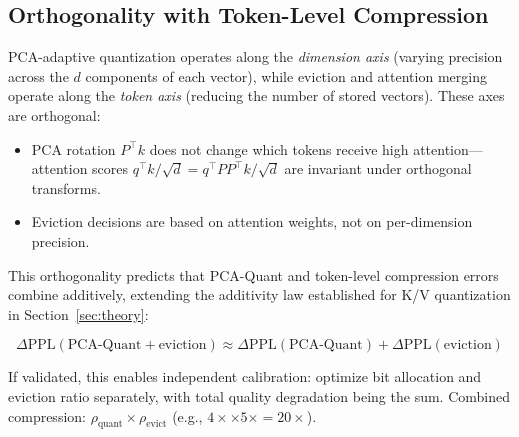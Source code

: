 \subsection{Orthogonality with Token-Level Compression}
\label{sec:orthogonality}

PCA-adaptive quantization operates along the \emph{dimension axis} (varying precision across the $d$ components of each vector), while eviction and attention merging operate along the \emph{token axis} (reducing the number of stored vectors). These axes are orthogonal:

\begin{itemize}
    \item PCA rotation $P^\top k$ does not change which tokens receive high attention---attention scores $q^\top k / \sqrt{d} = q^\top P P^\top k / \sqrt{d}$ are invariant under orthogonal transforms.
    \item Eviction decisions are based on attention weights, not on per-dimension precision.
\end{itemize}

This orthogonality predicts that PCA-Quant and token-level compression errors combine additively, extending the additivity law established for K/V quantization in Section~\ref{sec:theory}:

\begin{equation}
    \Delta\text{PPL}(\text{PCA-Quant} + \text{eviction}) \approx \Delta\text{PPL}(\text{PCA-Quant}) + \Delta\text{PPL}(\text{eviction})
\end{equation}

If validated, this enables independent calibration: optimize bit allocation and eviction ratio separately, with total quality degradation being the sum. Combined compression: $\rho_{\text{quant}} \times \rho_{\text{evict}}$ (e.g., $4\times \times 5\times = 20\times$).

